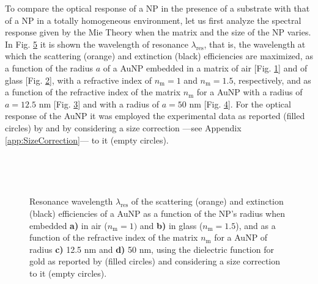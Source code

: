
To compare the optical response of a NP in the presence of a substrate with that of a NP in a totally homogeneous environment, let us first analyze the spectral response given by the Mie Theory when the matrix and the size of the NP varies. In Fig. \ref{fig:Mie:redshift} it is shown the wavelength of resonance $\lambda_\text{res}$, that is, the wavelength at which the scattering (orange) and extinction (black) efficiencies are maximized,  as a  function of the radius $a$ of a AuNP embedded in a matrix of air [Fig. \ref{sfig:red:1}] and of glass [Fig. \ref{sfig:red:2}], with a refractive index of $n_\text{m} = 1$ and $n_\text{m} = 1.5$, respectively, and as a function of the refractive index of the matrix $n_\text{m}$ for a AuNP with a radius of {$a = 12.5$ nm} [Fig. \ref{sfig:red:3}] and with a radius of $a = 50$ nm [Fig. \ref{sfig:red:4}]. For the optical response of the AuNP it was employed the experimental data as reported (filled circles) by \citeauthor{johnson_optical_1972} \cite{johnson_optical_1972}  and by considering a size correction ---see Appendix \ref{app:SizeCorrection}--- to it (empty circles).

\begin{figure}[h!] \centering
    \def\svgwidth{.9\textwidth}
    \vspace*{-18.6em} \\
    \hspace*{-5.9em}%
        \begin{subfigure}{.20\textwidth}\caption{ }\label{sfig:red:1}\end{subfigure}%
        \begin{subfigure}{.235\textwidth}\caption{ }\label{sfig:red:2}\end{subfigure}%
        \begin{subfigure}{.20\textwidth}\caption{ }\label{sfig:red:3}\end{subfigure}%
        \begin{subfigure}{.24\textwidth}\caption{ }\label{sfig:red:4}\end{subfigure}
    \vspace*{16.5em}\\
    \caption[Spectral redshift of the scattering and extinction  efficiencies of a spherical AuNP as a function of its size and the embedding media]{Resonance wavelength $\lambda_\text{res}$ of the scattering (orange) and extinction (black) efficiencies of a AuNP as a function of the NP's radius when embedded \textbf{a)} in air ($n_\text{m} = 1)$ and \textbf{b)} in glass ($n_\text{m} = 1.5$), and as a function of the refractive index of the matrix  $n_\text{m}$ for a AuNP of radius \textbf{c)} 12.5 nm and \textbf{d)} 50 nm, using the dielectric function for gold as reported by \citeauthor{johnson_optical_1972} (filled circles) and considering a size correction to it (empty circles).}
    \label{fig:Mie:redshift}
\end{figure}

